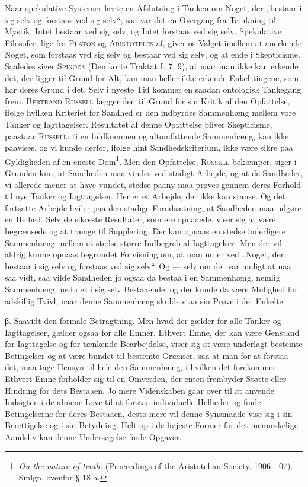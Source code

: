 \documentclass[12pt]{article}
\begin{document}
Naar spekulative Systemer lærte en Afslutning i Tanken om Noget, der „bestaar
i sig selv og forstaas ved sig selv“, saa var det en Overgang fra Tænkning til
Mystik. Intet bestaar ved sig selv, og Intet forstaas ved sig selv. Spekulative
Filosofer, lige fra \textsc{Platon} og \textsc{Aristoteles} af, giver os Valget
imellem at anerkende Noget, som forstaas ved sig selv og bestaar ved sig selv,
og at ende i Skepticisme. Saaledes siger \textsc{Spinoza} (Den korte Traktat I,
7, 9), at naar man ikke kan erkende det, der ligger til Grund for Alt, kan man
heller ikke erkende Enkelttingene, som har deres Grund i det. Selv i nyeste Tid
kommer en saadan ontologisk Tankegang frem. \textsc{Bertrand Russell} lægger den
til Grund for sin Kritik af den Opfattelse, ifølge hvilken Kriteriet for Sandhed
er den indbyrdes Sammenhæng mellem vore Tanker og Iagttagelser. Resultatet af
denne Opfattelse bliver Skepticisme, paastaar
\textsc{Russell}: ti en fuldkommen og altomfattende Sammenhæng, kan ikke
paavises, og vi kunde derfor, ifølge hint Sandhedskriterium, ikke være sikre paa
Gyldigheden af en eneste Dom\footnote{\textit{On the nature of truth.}
(Proceedings of the Aristotelian Society. 1906---07). Smlgn. ovenfor § 18 a.}.
Men den Opfattelse, \textsc{Russell} bekæmper, siger i Grunden kun, at Sandheden
maa vindes ved stadigt Arbejde, og at de Sandheder, vi allerede mener at have
vundet, stedse paany maa prøves gennem deres Forhold til nye Tanker og
Iagttagelser. Her er et Arbejde, der ikke kan stanse. Og det fortsatte Arbejde
hviler paa den stadige Forudsætning, at Sandheden maa udgøre en Helhed. Selv de
sikreste Resultater, som ere opnaaede, viser sig at være begrænsede og at trænge
til Supplering. Der kan opnaas en stedse inderligere Sammenhæng mellem et stedse
større Indbegreb af Iagttagelser. Men der vil aldrig kunne opnaas begrundet
Forvisning om, at man nu er ved „Noget, der bestaar i sig selv og forstaas ved
sig selv“. Og --- selv om det var muligt at naa saa vidt, saa vilde Sandheden jo
ogsaa da bestaa i en Sammenhæng, nemlig Sammenhæng med det i sig selv
Bestaaende, og der kunde da være Mulighed for adskillig Tvivl, naar denne
Sammenhæng skulde staa sin Prøve i det Enkelte.

β. Saavidt den formale Betragtning. Men hvad der gælder for alle Tanker og
Iagttagelser, gælder ogsaa for alle Emner. Ethvert Emne, der kan være Genstand
for Iagttagelse og for tænkende Bearbejdelse, viser sig at være underlagt
bestemte Betingelser og at være bundet til bestemte Grænser, saa at man for at
forstaa det, maa tage Hensyn til hele den Sammenhæng, i hvilken det forekommer.
Ethvert Emne forholder sig til en Omverden, der enten frembyder Støtte eller
Hindring for dets Bestaaen. Jo mere Videnskaben gaar over til at anvende
Indsigten i de almene Love til at forstaa individuelle Helheder og finde
Betingelserne for deres Bestaaen, desto mere vil denne Synsmaade vise sig i sin
Berettigelse og i sin Betydning. Helt op i de højeste Former for det
menneskelige Aandsliv kan denne Undersøgelse finde Opgaver. ---
\end{document}
